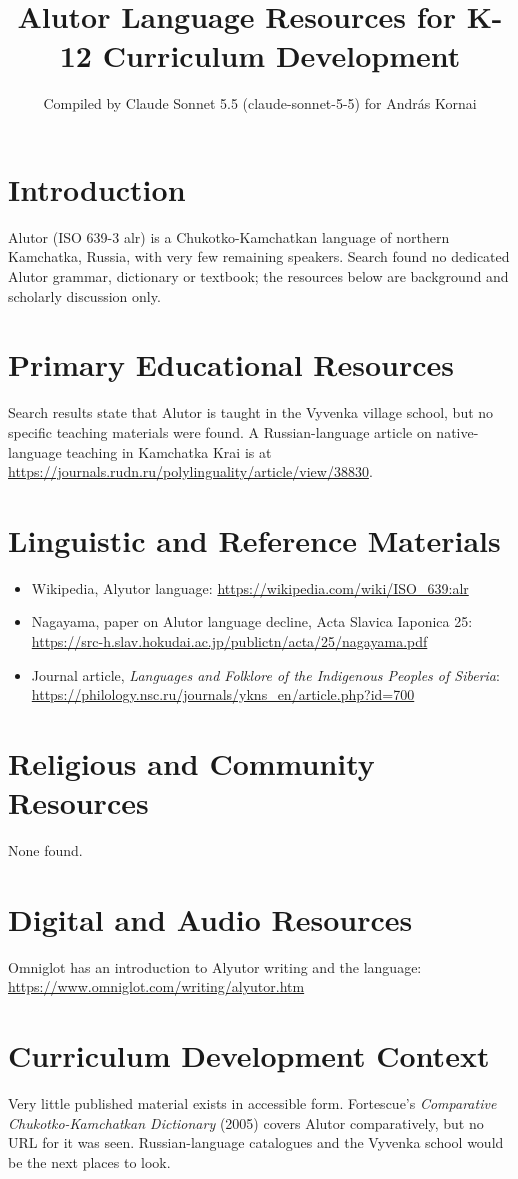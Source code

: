 \documentclass[12pt]{article}
\title{Alutor Language Resources for K-12 Curriculum Development}
\author{Compiled by Claude Sonnet 5.5 (claude-sonnet-5-5) for Andr\'as Kornai}
\date{}
\begin{document}
\maketitle

\section{Introduction}
Alutor (ISO 639-3 alr) is a Chukotko-Kamchatkan language of northern Kamchatka, Russia, with very few remaining speakers. Search found no dedicated Alutor grammar, dictionary or textbook; the resources below are background and scholarly discussion only.

\section{Primary Educational Resources}
Search results state that Alutor is taught in the Vyvenka village school, but no specific teaching materials were found. A Russian-language article on native-language teaching in Kamchatka Krai is at \url{https://journals.rudn.ru/polylinguality/article/view/38830}.

\section{Linguistic and Reference Materials}
\begin{itemize}
\item Wikipedia, Alyutor language: \url{https://wikipedia.com/wiki/ISO_639:alr}
\item Nagayama, paper on Alutor language decline, Acta Slavica Iaponica 25: \url{https://src-h.slav.hokudai.ac.jp/publictn/acta/25/nagayama.pdf}
\item Journal article, \emph{Languages and Folklore of the Indigenous Peoples of Siberia}: \url{https://philology.nsc.ru/journals/ykns_en/article.php?id=700}
\end{itemize}

\section{Religious and Community Resources}
None found.

\section{Digital and Audio Resources}
Omniglot has an introduction to Alyutor writing and the language: \url{https://www.omniglot.com/writing/alyutor.htm}

\section{Curriculum Development Context}
Very little published material exists in accessible form. Fortescue's \emph{Comparative Chukotko-Kamchatkan Dictionary} (2005) covers Alutor comparatively, but no URL for it was seen. Russian-language catalogues and the Vyvenka school would be the next places to look.
\end{document}
